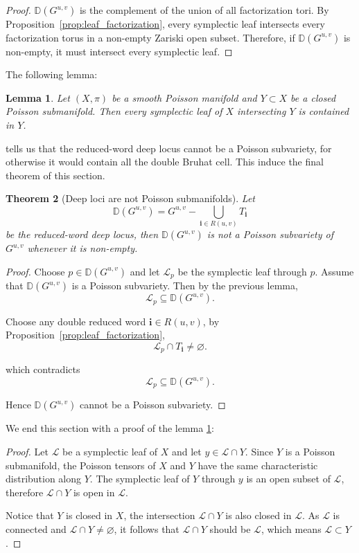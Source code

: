 \documentclass[12pt]{amsart}
\newcommand{\D}{\mathbb D}
\theoremstyle{plain}
\newtheorem{theorem}{Theorem}[section]
\newtheorem{lemma}[theorem]{Lemma}
\theoremstyle{definition}
\theoremstyle{remark}
\begin{document}
\begin{proof}
   \(\D(G^{u,v})\) is the complement of the union of all factorization tori. By Proposition~\ref{prop:leaf_factorization}, every symplectic leaf intersects every factorization torus in a non-empty Zariski open subset. Therefore, if \(\D(G^{u,v})\) is non-empty, it must intersect every symplectic leaf.
\end{proof}

The following lemma:

\begin{lemma}
   \label{lem:closed_contain_leaves}
Let $(X,\pi)$ be a smooth Poisson manifold and $Y\subset X$ be a
closed Poisson submanifold. Then every symplectic leaf of $X$ intersecting
$Y$ is contained in $Y$.
\end{lemma}

tells us that the reduced-word deep locus cannot be a Poisson subvariety, for otherwise it would contain all the double Bruhat cell. This induce the final theorem of this section.

\begin{theorem}[Deep loci are not Poisson submanifolds]
\label{thm:deep_not_poisson}
Let
\[
\mathbb D(G^{u,v})=G^{u,v}-\bigcup_{\mathbf i\in R(u,v)}T_{\mathbf i}
\]
be the reduced-word deep locus, then $\mathbb D(G^{u,v})$ is not a Poisson subvariety of
$G^{u,v}$ whenever it is non-empty.
\end{theorem}

\begin{proof}
Choose
\(
p\in\mathbb D(G^{u,v})
\)
and let $\mathcal L_p$ be the symplectic leaf through $p$. Assume that $\mathbb D(G^{u,v})$ is a Poisson subvariety. Then by the previous lemma,
\[
\mathcal L_p\subseteq\mathbb D(G^{u,v}).
\]

Choose any double reduced word $\mathbf i\in R(u,v)$, by Proposition~\ref{prop:leaf_factorization},
\[
\mathcal L_p\cap T_{\mathbf i}\neq\varnothing .
\]

which contradicts
\[
\mathcal L_p\subseteq\mathbb D(G^{u,v}).
\]

Hence $\mathbb D(G^{u,v})$ cannot be a Poisson subvariety.
\end{proof}

\noindent We end this section with a proof of the lemma \ref{lem:closed_contain_leaves}:
\begin{proof}
Let $\mathcal{L}$ be a symplectic leaf of $X$ and let $y\in\mathcal{L}\cap Y$. Since $Y$ is a Poisson submanifold, the Poisson tensors of $X$ and $Y$ have the same characteristic distribution along $Y$. The symplectic leaf of $Y$ through $y$ is an open subset of $\mathcal{L}$, therefore $\mathcal{L}\cap Y$ is open in $\mathcal{L}$. 

Notice that $Y$ is closed in $X$, the intersection $\mathcal{L}\cap Y$ is also closed in $\mathcal{L}$. As $\mathcal{L}$ is connected and $\mathcal{L}\cap Y\neq\varnothing$, it follows that $\mathcal{L}\cap Y$ should be $\mathcal{L}$, which means $\mathcal{L}\subset Y$.
\end{proof}
\end{document}
